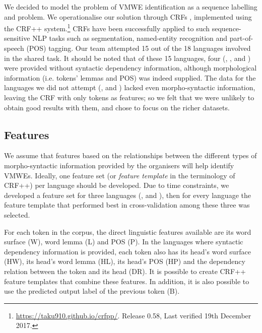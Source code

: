 \documentclass[output=paper,modfonts,nonflat]{langsci/langscibook}
\begin{document}
We decided to model the problem of VMWE identification as a sequence
labelling and  problem. We operationalise our solution
through CRFs \citep{Lafferty2001}, implemented using the
CRF++ system.\footnote{\url{https://taku910.github.io/crfpp/}. Release 0.58, Last verified 19th December 2017.} CRFs have
been successfully applied to such sequence-sensitive NLP tasks such as
segmentation, named-entity
recognition \citep{han2013chinese,han2015chinese} and part-of-speech (POS)
tagging. Our team attempted 15 out of the 18 languages involved in the
shared task.  It should be noted that of these 15 languages, four
(, ,  and ) were provided without syntactic
dependency information, although morphological information
(i.e. tokens' lemmas and POS) was indeed supplied.
The data for the languages we did not attempt (,  and
) lacked even morpho-syntactic information, leaving the CRF
with only tokens as features; so we felt that we were unlikely to
obtain good results with them, and chose to focus on the richer
datasets. 



\subsection{Features}

We assume that features based on the relationships between the
different types of morpho-syntactic information provided by the
organisers will help identify VMWEs. Ideally, one feature set (or
\emph{feature template} in the terminology of CRF++) per language
should be developed. Due to time constraints, we developed a
feature set for three languages (,  and ), then for
every language the feature template that performed best in
cross-validation among these three was selected.

For each token in the corpus, the direct linguistic features available 
are its word surface (W), word lemma (L) and POS (P). In the languages
where syntactic dependency information is provided, each token also
has its head's word surface (HW), its head's word lemma (HL), its
head's POS (HP) and the dependency relation between the token and its
head (DR). It is possible to create CRF++ feature templates that
combine these features. In addition, it is also possible to use the
predicted output label of the previous token (B). 
\end{document}
